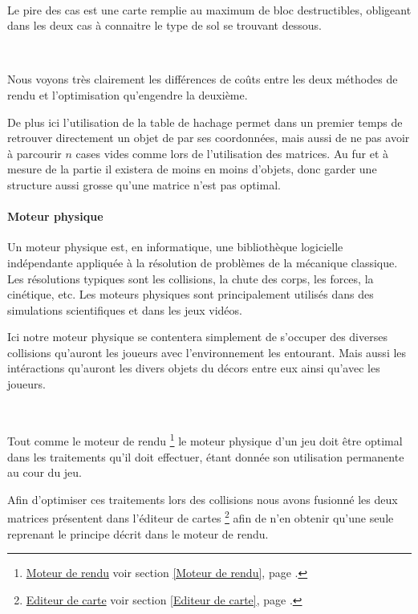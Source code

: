 {			$\,$
			
			Le pire des cas est une carte remplie au maximum de bloc destructibles,
			obligeant dans les deux cas à connaitre le type de sol se trouvant dessous.
			
			$\,$
			
			Nous voyons très clairement les différences de coûts entre les deux méthodes
			de rendu et l'optimisation qu'engendre la deuxième.
			
			De plus ici l'utilisation de la table de hachage permet dans un premier temps de
			retrouver directement un objet de par ses coordonnées, mais aussi de ne pas
			avoir à parcourir $n$ cases vides comme lors de l'utilisation des matrices.
			Au fur et à mesure de la partie il existera de moins en moins d'objets,
			donc garder une structure aussi grosse qu'une matrice n'est pas optimal.
		
		\paragraph{Moteur physique\\}
		
			\hypertarget{Moteur physique}{}
			\label{Moteur physique}
			
			Un moteur physique est, en informatique, une bibliothèque logicielle 
			indépendante appliquée à la résolution de problèmes de la mécanique
			classique.  Les résolutions typiques sont les collisions, la chute des corps,
			les forces, la cinétique, etc.
			Les moteurs physiques sont principalement utilisés dans des simulations 
			scientifiques et dans les jeux vidéos.
			
			
			Ici notre moteur physique se contentera simplement de s'occuper des diverses
			collisions qu'auront les joueurs avec l'environnement les entourant. Mais
			aussi les intéractions qu'auront les divers objets du décors entre eux
			ainsi qu'avec les joueurs.

			$\,$		
			
			Tout comme le moteur de rendu
			\footnote{
				\hyperlink{Moteur de rendu}{Moteur de rendu}
				\og voir section \ref{Moteur de rendu}, page \pageref{Moteur de rendu}.\fg
			}
			le moteur physique d'un jeu doit être optimal dans les traitements qu'il doit
			effectuer, étant donnée son utilisation permanente au cour du jeu.
			
			
			Afin d'optimiser ces traitements lors des collisions nous avons fusionné les
			deux matrices présentent dans l'éditeur de cartes
			\footnote{
				\hyperlink{Editeur de carte}{Editeur de carte}
				\og voir section \ref{Editeur de carte}, page \pageref{Editeur de carte}.\fg
			}
			afin de n'en obtenir qu'une seule reprenant le principe décrit dans le moteur
			de rendu\footnotemark[2].
			
}
